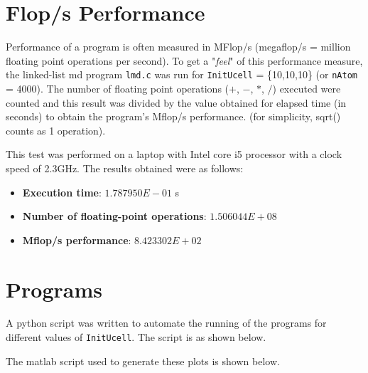 \documentclass[11pt, oneside]{article}   	%
\begin{document}
\section{Flop/s Performance}
Performance of a program is often measured in MFlop/s (megaflop/s = million floating point operations per second). To get a "\textit{feel}" of this performance measure, the linked-list md program \texttt{lmd.c} was run for \texttt{InitUcell} = \{10,10,10\} (or \texttt{nAtom} = 4000). The number of floating point operations ($+$, $-$, $*$, $/$) executed were counted and this result was divided by the value obtained for elapsed time (in seconds) to obtain the program's Mflop/s performance. (for simplicity, sqrt() counts as 1 operation).

This test was performed on a laptop with Intel core i5 processor with a clock speed of 2.3GHz. The results obtained were as follows:
\begin{itemize}
	\item \textbf{Execution time}: $1.787950E-01$ s
	\item \textbf{Number of floating-point operations}: $1.506044E+08$
	\item \textbf{Mflop/s performance}: $8.423302E+02$
\end{itemize}

\appendix
\section{Programs}
A python script was written to automate the running of the programs for different values of \texttt{InitUcell}. The script is as shown below.


The matlab script used to generate these plots is shown below.
	
\end{document}

